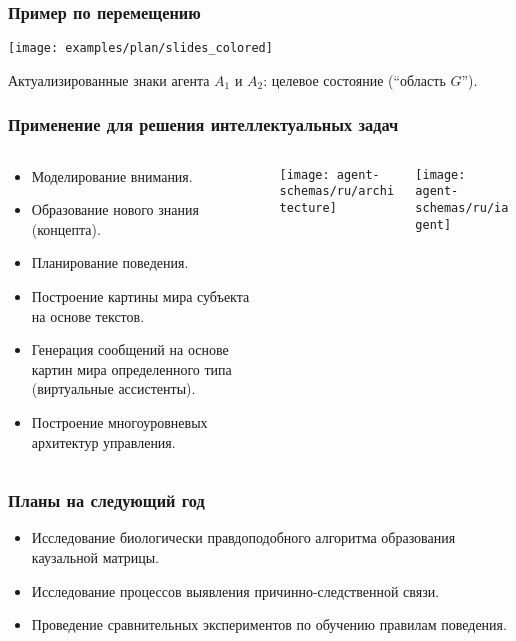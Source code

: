 \documentclass[default]{beamer}
\begin{document}
	\begin{frame}
		\frametitle{Пример по перемещению}
		
		\begin{center}
			\texttt{[image: examples/plan/slides\_colored]}
		\end{center}
		\par\bigskip
		Актуализированные знаки агента $A_1$ и $A_2$: целевое состояние (``область $G$'').
	\end{frame}
	
	\begin{frame}
		\frametitle{Применение для решения интеллектуальных задач}
		\vspace{-5pt}
		\footnotesize
		\begin{columns}
			\begin{column}{0.5\textwidth}
				\begin{itemize}
					\item Моделирование внимания.
					\item Образование нового знания (концепта).
					\item Планирование поведения.
					\item Построение картины мира субъекта на основе текстов.
					\item Генерация сообщений на основе картин мира определенного типа (виртуальные ассистенты).
					\item Построение многоуровневых архитектур управления.
				\end{itemize}
				
			\end{column}
			\begin{column}{0.35\textwidth}
				\texttt{[image: agent-schemas/ru/architecture]}
			\end{column}
			\begin{column}{0.15\textwidth}
				\texttt{[image: agent-schemas/ru/iagent]}
			\end{column}
			
		\end{columns}
		\vspace{-5pt}
		\nocite{*}
		\printbibliography[keyword={strl}, resetnumbers=true]
	\end{frame}

	\begin{frame}
		\frametitle{Планы на следующий год}
		
		\begin{itemize}
			\item Исследование биологически правдоподобного алгоритма образования каузальной матрицы.
			\item Исследование процессов выявления причинно-следственной связи.
			\item Проведение сравнительных экспериментов по обучению правилам поведения.
		\end{itemize}
	\end{frame}
\end{document}
